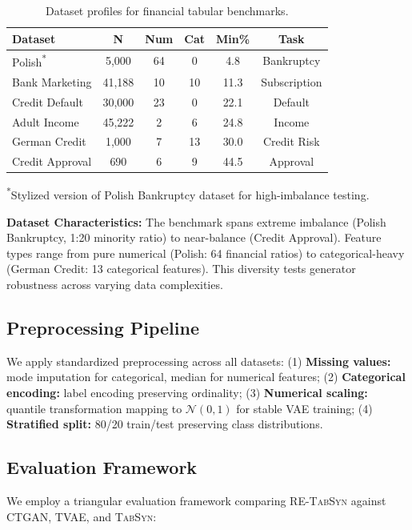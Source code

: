 \documentclass[conference]{IEEEtran}
\newcommand{\retabsyn}{\textsc{RE-TabSyn}}
\newcommand{\tabsyn}{\textsc{TabSyn}}
\newcommand{\ctgan}{\textsc{CTGAN}}
\begin{document}
\begin{table}[htbp]
\caption{Dataset profiles for financial tabular benchmarks.}
\label{tab:datasets}
\centering
\small
\begin{tabular}{lccccc}
\toprule
\textbf{Dataset} & \textbf{N} & \textbf{Num} & \textbf{Cat} & \textbf{Min\%} & \textbf{Task} \\
\midrule
Polish\textsuperscript{*} & 5,000 & 64 & 0 & 4.8 & Bankruptcy \\
Bank Marketing & 41,188 & 10 & 10 & 11.3 & Subscription \\
Credit Default & 30,000 & 23 & 0 & 22.1 & Default \\
Adult Income & 45,222 & 2 & 6 & 24.8 & Income \\
German Credit & 1,000 & 7 & 13 & 30.0 & Credit Risk \\
Credit Approval & 690 & 6 & 9 & 44.5 & Approval \\
\bottomrule
\end{tabular}
\end{table}
\small \textsuperscript{*}Stylized version of Polish Bankruptcy dataset for high-imbalance testing.

\textbf{Dataset Characteristics:} The benchmark spans extreme imbalance (Polish Bankruptcy, 1:20 minority ratio) to near-balance (Credit Approval). Feature types range from pure numerical (Polish: 64 financial ratios) to categorical-heavy (German Credit: 13 categorical features). This diversity tests generator robustness across varying data complexities.

\subsection{Preprocessing Pipeline}
We apply standardized preprocessing across all datasets: (1) \textbf{Missing values:} mode imputation for categorical, median for numerical features; (2) \textbf{Categorical encoding:} label encoding preserving ordinality; (3) \textbf{Numerical scaling:} quantile transformation mapping to $\mathcal{N}(0,1)$ for stable VAE training; (4) \textbf{Stratified split:} 80/20 train/test preserving class distributions.

\subsection{Evaluation Framework}
We employ a triangular evaluation framework comparing \retabsyn{} against \ctgan{}, TVAE, and \tabsyn{}:
\end{document}
